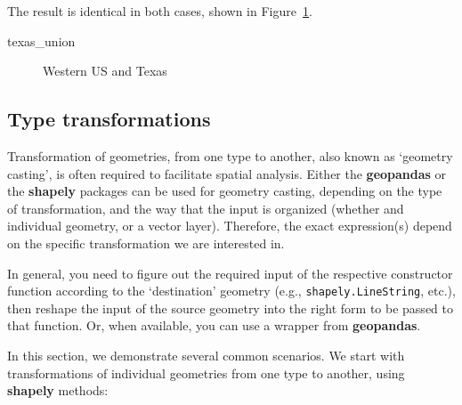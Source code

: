 \documentclass[
  letterpaper,
]{krantz}
\newenvironment{Shaded}{\begin{snugshade}}{\end{snugshade}}
\newcommand{\NormalTok}[1]{\textcolor[rgb]{0.00,0.23,0.31}{#1}}
\begin{document}
The result is identical in both cases, shown in
Figure~\ref{fig-dissolve3}.

\begin{Shaded}
\begin{Highlighting}[]
\NormalTok{texas\_union}
\end{Highlighting}
\end{Shaded}

\begin{figure}[H]


\caption{\label{fig-dissolve3}Western US and Texas}

\end{figure}%

\subsection{Type transformations}\label{sec-type-transformations}

Transformation of geometries, from one type to another, also known as
`geometry casting', is often required to facilitate spatial analysis.
Either the \textbf{geopandas} or the \textbf{shapely} packages can be
used for geometry casting, depending on the type of transformation, and
the way that the input is organized (whether and individual geometry, or
a vector layer). Therefore, the exact expression(s) depend on the
specific transformation we are interested in.

In general, you need to figure out the required input of the respective
constructor function according to the `destination' geometry (e.g.,
\texttt{shapely.LineString}, etc.), then reshape the input of the source
geometry into the right form to be passed to that function. Or, when
available, you can use a wrapper from \textbf{geopandas}.

In this section, we demonstrate several common scenarios. We start with
transformations of individual geometries from one type to another, using
\textbf{shapely} methods:
\end{document}
